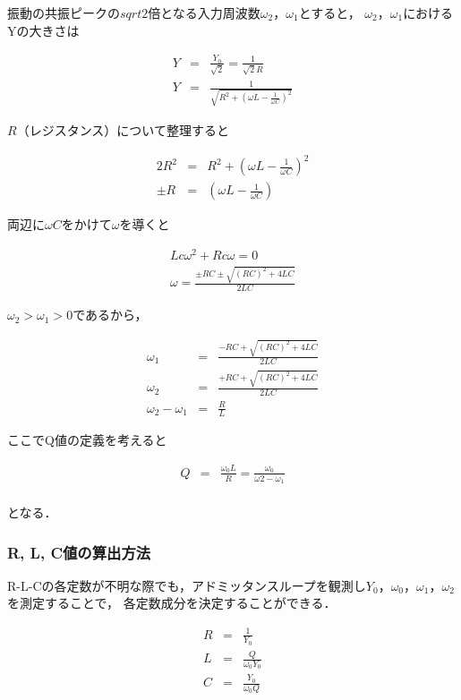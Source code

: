 \documentclass[dvipdfmx,titlepage,a4j]{jsarticle}  %
\numberwithin{equation}{section}
\begin{document}
振動の共振ピークの$sqrt{2}$倍となる入力周波数$\omega_2$，$\omega_1$とすると，
$\omega_2$，$\omega_1$におけるYの大きさは

\begin{eqnarray}
  Y &=& \frac{Y_0}{\sqrt{2}} = \frac{1}{\sqrt{2}R} \\
  Y &=& \frac{1}{\sqrt{R^2 + (\omega L - \frac{1}{\omega C})^2}}
\end{eqnarray}

$R$（レジスタンス）について整理すると

\begin{eqnarray}
  2R^2 &=& R^2 + (\omega L - \frac{1}{\omega C})^2 \\
  \pm R &=& (\omega L - \frac{1}{\omega C})
\end{eqnarray}

両辺に$\omega C$をかけて$\omega$を導くと

\begin{eqnarray}
  Lc \omega^2 + Rc\omega = 0\\
  \omega = \frac{\pm RC \pm \sqrt{(RC)^2 + 4LC}}{2LC}
\end{eqnarray}

$\omega_2 > \omega_1 > 0$であるから，

\begin{eqnarray}
  \omega_1 &=& \frac{-RC + \sqrt{(RC)^2 + 4LC}}{2LC} \\
  \omega_2 &=& \frac{+RC + \sqrt{(RC)^2 + 4LC}}{2LC} \\
  \omega_2 - \omega_1 &=& \frac{R}{L}
\end{eqnarray}

ここでQ値の定義を考えると

\begin{eqnarray}
  Q &=& \frac{\omega_0 L}{R} = \frac{\omega_0}{\omega2 - \omega_1}\\
\end{eqnarray}

となる．

\subsubsection{R, L, C値の算出方法}
R-L-Cの各定数が不明な際でも，アドミッタンスループを観測し$Y_0$，$\omega_0$，$\omega_1$，$\omega_2$を測定することで，
各定数成分を決定することができる．

\begin{eqnarray}
  R &=& \frac{1}{Y_0} \\
  L &=& \frac{Q}{\omega_0 Y_0} \\
  C &=& \frac{Y_0}{\omega_0 Q}
\end{eqnarray}
\end{document}
